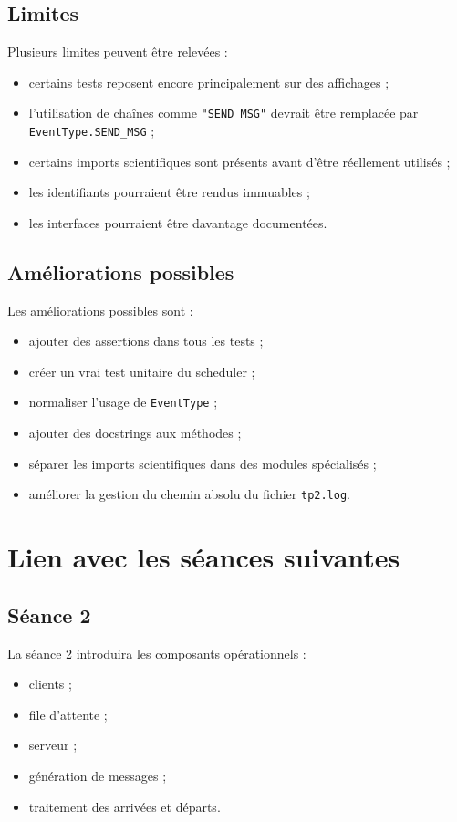 \documentclass{article}
\begin{document}
\subsection{Limites}

Plusieurs limites peuvent être relevées :
\begin{itemize}[leftmargin=*]
    \item certains tests reposent encore principalement sur des affichages ;
    \item l’utilisation de chaînes comme \texttt{"SEND\_MSG"} devrait être remplacée par \texttt{EventType.SEND\_MSG} ;
    \item certains imports scientifiques sont présents avant d’être réellement utilisés ;
    \item les identifiants pourraient être rendus immuables ;
    \item les interfaces pourraient être davantage documentées.
\end{itemize}

\subsection{Améliorations possibles}

Les améliorations possibles sont :
\begin{itemize}[leftmargin=*]
    \item ajouter des assertions dans tous les tests ;
    \item créer un vrai test unitaire du scheduler ;
    \item normaliser l’usage de \texttt{EventType} ;
    \item ajouter des docstrings aux méthodes ;
    \item séparer les imports scientifiques dans des modules spécialisés ;
    \item améliorer la gestion du chemin absolu du fichier \texttt{tp2.log}.
\end{itemize}

\section{Lien avec les séances suivantes}

\subsection{Séance 2}

La séance 2 introduira les composants opérationnels :
\begin{itemize}[leftmargin=*]
    \item clients ;
    \item file d’attente ;
    \item serveur ;
    \item génération de messages ;
    \item traitement des arrivées et départs.
\end{itemize}
\end{document}
